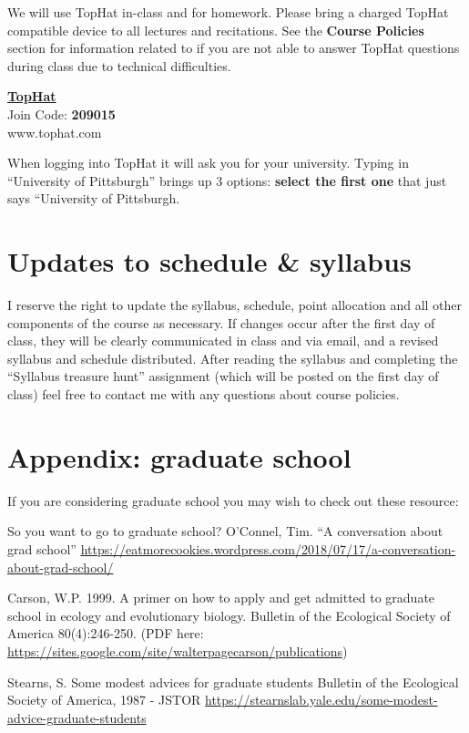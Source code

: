 \documentclass[
]{book}
\begin{document}
We will use TopHat in-class and for homework. Please bring a charged TopHat compatible device to all lectures and recitations. See the \textbf{Course Policies} section for information related to if you are not able to answer TopHat questions during class due to technical difficulties.

\href{www.tophat.com}{\textbf{TopHat}}\\
Join Code: \textbf{209015}\\
www.tophat.com

When logging into TopHat it will ask you for your university. Typing in ``University of Pittsburgh'' brings up 3 options: \textbf{select the first one} that just says ``University of Pittsburgh.

\hypertarget{updates-to-schedule-syllabus}{%
\chapter{Updates to schedule \& syllabus}\label{updates-to-schedule-syllabus}}

I reserve the right to update the syllabus, schedule, point allocation and all other components of the course as necessary. If changes occur after the first day of class, they will be clearly communicated in class and via email, and a revised syllabus and schedule distributed. After reading the syllabus and completing the ``Syllabus treasure hunt'' assignment (which will be posted on the first day of class) feel free to contact me with any questions about course policies.

\hypertarget{appendix-graduate-school}{%
\chapter{Appendix: graduate school}\label{appendix-graduate-school}}

If you are considering graduate school you may wish to check out these resource:

So you want to go to graduate school?
O'Connel, Tim. ``A conversation about grad school'' \url{https://eatmorecookies.wordpress.com/2018/07/17/a-conversation-about-grad-school/}

Carson, W.P. 1999. A primer on how to apply and get admitted to graduate school in ecology and evolutionary biology. Bulletin of the Ecological Society of America 80(4):246-250. (PDF here: \url{https://sites.google.com/site/walterpagecarson/publications})

Stearns, S. Some modest advices for graduate students
Bulletin of the Ecological Society of America, 1987 - JSTOR
\url{https://stearnslab.yale.edu/some-modest-advice-graduate-students}
\end{document}
